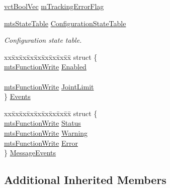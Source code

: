 \begin{DoxyCompactItemize}
\item 
\hyperlink{vct_dynamic_vector_types_8h_aeb2237c134aee3769198bd9d55c8a9e0}{vct\-Bool\-Vec} \hyperlink{classmts_p_i_d_a252699210cef3f2a0019741c83ef76a5}{m\-Tracking\-Error\-Flag}
\item 
\hyperlink{classmts_state_table}{mts\-State\-Table} \hyperlink{classmts_p_i_d_a06df8f0f65fe6954383297ead5a689e8}{Configuration\-State\-Table}
\begin{DoxyCompactList}\small\item\em Configuration state table. \end{DoxyCompactList}\item 
\begin{tabbing}
xx\=xx\=xx\=xx\=xx\=xx\=xx\=xx\=xx\=\kill
struct \{\\
\>\hyperlink{classmts_function_write}{mtsFunctionWrite} \hyperlink{classmts_p_i_d_a4efed84bae5ad01ca97f3528ff127e46}{Enabled}\\
\>\\
\>\hyperlink{classmts_function_write}{mtsFunctionWrite} \hyperlink{classmts_p_i_d_a1cb8718c99e9cc9c6031ced565ea9f88}{JointLimit}\\
\} \hyperlink{classmts_p_i_d_a155db3b413e484026deedabceeabddcc}{Events}\\

\end{tabbing}\item 
\begin{tabbing}
xx\=xx\=xx\=xx\=xx\=xx\=xx\=xx\=xx\=\kill
struct \{\\
\>\hyperlink{classmts_function_write}{mtsFunctionWrite} \hyperlink{classmts_p_i_d_ad1821194105cd685d56442e1b94fb13d}{Status}\\
\>\hyperlink{classmts_function_write}{mtsFunctionWrite} \hyperlink{classmts_p_i_d_a8709a00ef29de0762de33660c1cd3167}{Warning}\\
\>\hyperlink{classmts_function_write}{mtsFunctionWrite} \hyperlink{classmts_p_i_d_a8c6b0ae17ab02f78221ce9446f650e90}{Error}\\
\} \hyperlink{classmts_p_i_d_ae97c5912879b895a529396539e9da1f5}{MessageEvents}\\

\end{tabbing}\end{DoxyCompactItemize}
\subsection*{Additional Inherited Members}


